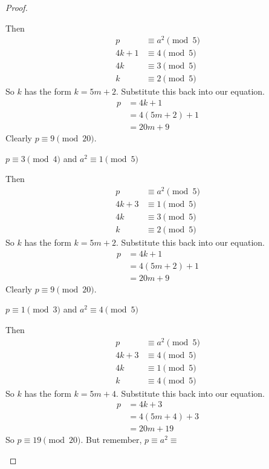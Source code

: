 \begin{proof}
\begin{case}
Then
\begin{align*}
		  p &\equiv a^2 \pmod 5 \\
	 4k + 1 &\equiv 4 \pmod 5 \\
	     4k &\equiv 3 \pmod 5 \\
	      k &\equiv 2 \pmod 5
\end{align*}
So $k$ has the form $k=5m+2$. Substitute this back into our equation.
\begin{align*}
	p &= 4k + 1 \\
	  &= 4(5m+2) + 1 \\
	  &= 20m + 9
\end{align*}
Clearly $p \equiv 9 \pmod{20}$.
\end{case}

\begin{case}
$p \equiv 3 \pmod 4$ and $a^2 \equiv 1 \pmod 5$

Then
\begin{align*}
		  p &\equiv a^2 \pmod 5 \\
	 4k + 3 &\equiv 1 \pmod 5 \\
	     4k &\equiv 3 \pmod 5 \\
	      k &\equiv 2 \pmod 5
\end{align*}
So $k$ has the form $k=5m+2$. Substitute this back into our equation.
\begin{align*}
	p &= 4k + 1 \\
	  &= 4(5m+2) + 1 \\
	  &= 20m + 9
\end{align*}
Clearly $p \equiv 9 \pmod{20}$.
\end{case}

\begin{case}
$p \equiv 1 \pmod 3$ and $a^2 \equiv 4 \pmod 5$

Then
\begin{align*}
		  p &\equiv a^2 \pmod 5 \\
	 4k + 3 &\equiv 4 \pmod 5 \\
	     4k &\equiv 1 \pmod 5 \\
	      k &\equiv 4 \pmod 5
\end{align*}
So $k$ has the form $k=5m+4$. Substitute this back into our equation.
\begin{align*}
	p &= 4k + 3 \\
	  &= 4(5m+4) + 3 \\
	  &= 20m + 19
\end{align*}
So $p \equiv 19 \pmod{20}$. But remember, $p \equiv a^2 \equiv $
\end{case}

\end{proof}


